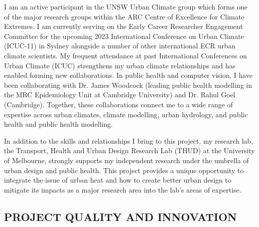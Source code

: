 I am an active participant in the UNSW Urban Climate group which forms one of the major research groups within the ARC Centre of Excellence for Climate Extremes. I am currently serving on the Early Career Researcher Engagement Committee for the upcoming 2023 International Conference on Urban Climate (ICUC-11) in Sydney alongside a number of other international ECR urban climate scientists. My frequent attendance at past International Conferences on Urban Climate (ICUC) strengthens my urban climate relationships and has enabled forming new collaborations. In public health and computer vision, I have been collaborating with Dr. James Woodcock (leading public health modelling in the MRC Epidemiology Unit at Cambridge University) and Dr. Rahul Goel (Cambridge). Together, these collaborations connect me to a wide range of expertise across urban climates, climate modelling, urban hydrology, and public health and public health modelling.

In addition to the skills and relationships I bring to this project, my research lab, the Transport, Health and Urban Design Research Lab (THUD) at the University of Melbourne, strongly supports my independent research under the umbrella of urban design and public health. This project provides a unique opportunity to integrate the issue of urban heat and how to create better urban design to mitigate its impacts as a major research area into the lab's areas of expertise.

\subsection*{\TitleFont PROJECT QUALITY AND INNOVATION}



